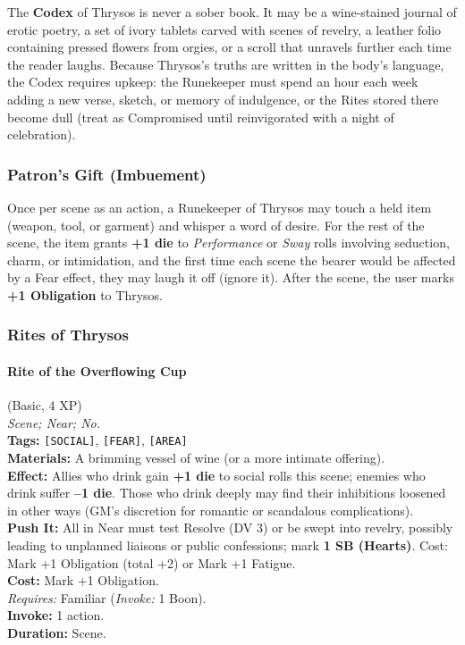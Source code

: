The \textbf{Codex} of Thrysos is never a sober book. It may be a wine-stained journal of erotic poetry, a set of ivory tablets carved with scenes of revelry, a leather folio containing pressed flowers from orgies, or a scroll that unravels further each time the reader laughs. Because Thrysos's truths are written in the body's language, the Codex requires upkeep: the Runekeeper must spend an hour each week adding a new verse, sketch, or memory of indulgence, or the Rites stored there become dull (treat as Compromised until reinvigorated with a night of celebration).

\subsubsection*{Patron's Gift (Imbuement)}

Once per scene as an action, a Runekeeper of Thrysos may touch a held item (weapon, tool, or garment) and whisper a word of desire. For the rest of the scene, the item grants \textbf{+1 die} to \textit{Performance} or \textit{Sway} rolls involving seduction, charm, or intimidation, and the first time each scene the bearer would be affected by a Fear effect, they may laugh it off (ignore it). After the scene, the user marks \textbf{+1 Obligation} to Thrysos.

\subsubsection*{Rites of Thrysos}

\paragraph{Rite of the Overflowing Cup} (Basic, 4 XP) \hfill \\
\emph{Scene; Near; No.} \\
\textbf{Tags:} \texttt{[SOCIAL]}, \texttt{[FEAR]}, \texttt{[AREA]} \\
\textbf{Materials:} A brimming vessel of wine (or a more intimate offering). \\
\textbf{Effect:} Allies who drink gain \textbf{+1 die} to social rolls this scene; enemies who drink suffer \textbf{--1 die}. Those who drink deeply may find their inhibitions loosened in other ways (GM's discretion for romantic or scandalous complications). \\
\textbf{Push It:} All in Near must test Resolve (DV 3) or be swept into revelry, possibly leading to unplanned liaisons or public confessions; mark \textbf{1 SB (Hearts)}. Cost: Mark +1 Obligation (total +2) or Mark +1 Fatigue. \\
\textbf{Cost:} Mark +1 Obligation. \\
\textit{Requires:} Familiar (\textit{Invoke:} 1 Boon). \\
\textbf{Invoke:} 1 action. \\
\textbf{Duration:} Scene.

